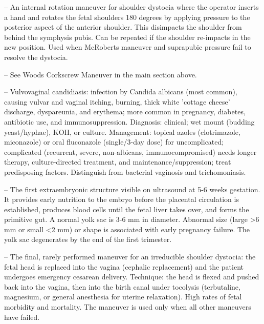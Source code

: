 -- An internal rotation maneuver for shoulder dystocia where the operator inserts a hand and rotates the fetal shoulders 180 degrees by applying pressure to the posterior aspect of the anterior shoulder. This disimpacts the shoulder from behind the symphysis pubis. Can be repeated if the shoulder re-impacts in the new position. Used when McRoberts maneuver and suprapubic pressure fail to resolve the dystocia.

-- See Woods Corkscrew Maneuver in the main section above.

-- Vulvovaginal candidiasis: infection by Candida albicans (most common), causing vulvar and vaginal itching, burning, thick white 'cottage cheese' discharge, dyspareunia, and erythema; more common in pregnancy, diabetes, antibiotic use, and immunosuppression. Diagnosis: clinical; wet mount (budding yeast/hyphae), KOH, or culture. Management: topical azoles (clotrimazole, miconazole) or oral fluconazole (single/3-day dose) for uncomplicated; complicated (recurrent, severe, non-albicans, immunocompromised) needs longer therapy, culture-directed treatment, and maintenance/suppression; treat predisposing factors. Distinguish from bacterial vaginosis and trichomoniasis.

-- The first extraembryonic structure visible on ultrasound at 5-6 weeks gestation. It provides early nutrition to the embryo before the placental circulation is established, produces blood cells until the fetal liver takes over, and forms the primitive gut. A normal yolk sac is 3-6 mm in diameter. Abnormal size (large >6 mm or small <2 mm) or shape is associated with early pregnancy failure. The yolk sac degenerates by the end of the first trimester.

-- The final, rarely performed maneuver for an irreducible shoulder dystocia: the fetal head is replaced into the vagina (cephalic replacement) and the patient undergoes emergency cesarean delivery. Technique: the head is flexed and pushed back into the vagina, then into the birth canal under tocolysis (terbutaline, magnesium, or general anesthesia for uterine relaxation). High rates of fetal morbidity and mortality. The maneuver is used only when all other maneuvers have failed.


